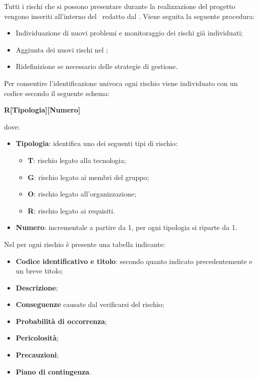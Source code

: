 \label{GestioneRischi}Tutti i rischi che si possono presentare durante la realizzazione del progetto vengono inseriti all'interno del \PdPv\ redatto dal \Responsabile.
Viene seguita la seguente procedura:
\begin{itemize}
	\item Individuazione di nuovi problemi e monitoraggio dei rischi già individuati;
	\item Aggiunta dei nuovi rischi nel {\PdP};
	\item Ridefinizione se necessario delle strategie di gestione.
\end{itemize}
Per consentire l'identificazione univoca ogni rischio viene individuato con un codice secondo il seguente schema:
\begin{center}
	\textbf{R[Tipologia][Numero]}
\end{center}
dove: 
\begin{itemize}
	\item \textbf{Tipologia}: identifica uno dei seguenti tipi di rischio:
		\begin{itemize}
			\item \textbf{T}: rischio legato alla tecnologia;
			\item \textbf{G}: rischio legato ai membri del gruppo;
			\item \textbf{O}: rischio legato all'organizzazione;
			\item \textbf{R}: rischio legato ai requisiti.
		\end{itemize}
	\item \textbf{Numero}: incrementale a partire da 1, per ogni tipologia si riparte da 1.
\end{itemize}
Nel  per ogni rischio è presente una tabella indicante:
\begin{itemize}
	\item \textbf{Codice identificativo e titolo}: secondo quanto indicato precedentemente e un breve titolo;
	\item \textbf{Descrizione};
	\item \textbf{Conseguenze} causate dal verificarsi del rischio;
	\item \textbf{Probabilità di occorrenza};
	\item \textbf{Pericolosità};
	\item \textbf{Precauzioni};
	\item \textbf{Piano di contingenza}.
\end{itemize}

